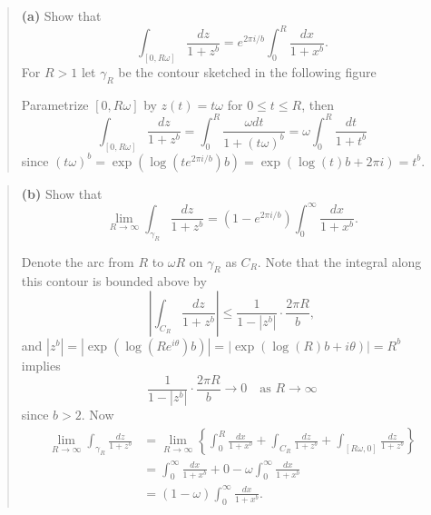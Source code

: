 \documentclass{homework}
\begin{document}
\begin{quote}
  {\bf (a)} Show that
  $$
    \int_{[0,R\omega]}\frac{dz}{1+z^b} = e^{2\pi i/b} \int_0^R \frac{dx}{1+x^b}.
  $$
  For $R>1$ let $\gamma_R$ be the contour sketched in the following figure
  \begin{center}
  \end{center}
  \begin{solution}
    Parametrize $[0,R\omega]$ by $z(t) = t\omega$ for $0\le t \le R$, then
    $$
      \int_{[0,R\omega]}\frac{dz}{1+z^b} = \int_0^R \frac{\omega dt}{1+(t\omega)^b} = \omega\int_0^R \frac{dt}{1+t^b}
    $$
    since $(t\omega)^b = \exp(\log(te^{2\pi i/b})b ) = \exp(\log(t)b + 2\pi i)  = t^b$.
  \end{solution}
\end{quote}
\begin{quote}
  {\bf (b)} Show that
  $$
    \lim_{R\to\infty} \int_{\gamma_R} \frac{dz}{1+z^b} = (1 - e^{2\pi i/b})\int_0^\infty\frac{dx}{1+x^b}.
  $$
  \begin{solution}
    Denote the arc from $R$ to $\omega R$ on $\gamma_R$ as $C_R$. Note that the integral along this contour is bounded above by
    $$
      \left|\int_{C_R}\frac{dz}{1+z^b} \right| \le \frac{1}{1 - |z^b|}\cdot \frac{2\pi R}{b},
    $$ 
    and $|z^b| = |\exp(\log( Re^{i\theta} )b)| = |\exp(\log(R)b + i\theta)| = R^b$ implies 
    $$
      \frac{1}{1 - |z^b|}\cdot \frac{2\pi R}{b} \to 0\quad\text{as }R\to \infty
    $$
    since $b > 2$.  Now
    \begin{align*}
      \lim_{R\to\infty}\int_{\gamma_R}\frac{dz}{1+z^b} 
      &= \lim_{R\to\infty}\left\{\int_0^R \frac{dx}{1+x^b} + \int_{C_R} \frac{dz}{1+z^b} + \int_{[R\omega,0]} \frac{dz}{1+z^b}\right\}\\
      &= \int_0^\infty \frac{dx}{1+x^b} + 0 - \omega\int_0^\infty \frac{dx}{1+x^b}\\
      &= (1-\omega)\int_0^\infty \frac{dx}{1+x^b}.
    \end{align*}
  \end{solution}
\end{quote}
\end{document}
